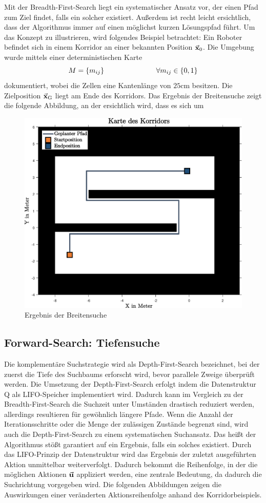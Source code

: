 Mit der Breadth-First-Search liegt ein systematischer Ansatz vor, der einen Pfad zum Ziel findet, falls ein solcher existiert. Außerdem ist recht leicht ersichtlich, dass der Algorithmus immer auf einen möglichst kurzen Lösungspfad führt. Um das Konzept zu illustrieren, wird folgendes Beispiel betrachtet: Ein Roboter befindet sich in einem Korridor an einer bekannten Position $\vec{\mathbf{x}}_{\text{0}}$. Die Umgebung wurde mittels einer deterministischen Karte
\begin{equation}
M = \left\{m_{ij}\right\} \hspace{2.5cm} \forall m_{ij} \in \left\{0, 1\right\}
\end{equation}
dokumentiert, wobei die Zellen eine Kantenlänge von $25 \text{cm}$ besitzen. Die Zielposition $\vec{\mathbf{x}}_{\text{G}}$ liegt am Ende des Korridors. Das Ergebnis der Breitensuche zeigt die folgende Abbildung, an der ersichtlich wird, dass es sich um 

\begin{figure}[!ht]
\centering
\includegraphics[width=0.7\linewidth]{img/KorridorBeispiel_img1.eps}
\caption{Ergebnis der Breitensuche}
\end{figure}


\subsection{Forward-Search: Tiefensuche}
Die komplementäre Suchstrategie wird als Depth-First-Search bezeichnet, bei der zuerst die Tiefe des Suchbaums erforscht wird, bevor parallele Zweige überprüft werden. Die Umsetzung der Depth-First-Search erfolgt indem die Datenstruktur Q als LIFO-Speicher implementiert wird. Dadurch kann im Vergleich zu der Breadth-First-Search die Suchzeit unter Umständen drastisch reduziert werden, allerdings resultieren für gewöhnlich längere Pfade. Wenn die Anzahl der Iterationsschritte oder die Menge der zulässigen Zustände begrenzt sind, wird auch die Depth-First-Search zu einem systematischen Suchansatz. Das heißt der Algorithmus stößt garantiert auf ein Ergebnis, falls ein solches existiert. Durch das LIFO-Prinzip der Datenstruktur wird das Ergebnis der zuletzt ausgeführten Aktion unmittelbar weiterverfolgt. Dadurch bekommt die Reihenfolge, in der die möglichen Aktionen $\vec{\mathbf{u}}$ appliziert werden, eine zentrale Bedeutung, da dadurch die Suchrichtung vorgegeben wird. Die folgenden Abbildungen zeigen die Auswirkungen einer veränderten Aktionsreihenfolge anhand des Korridorbeispiels.

